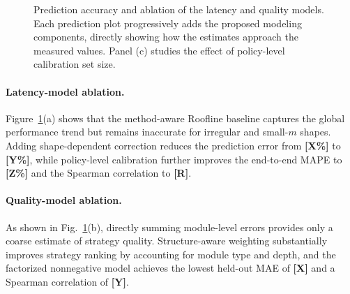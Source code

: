 \documentclass[letterpaper]{article} %
\begin{document}
\begin{figure}[t]
\centering
{}
\vspace{1mm}

\vspace{1mm}

\caption{Prediction accuracy and ablation of the latency and quality models. Each prediction plot progressively adds the proposed modeling components, directly showing how the estimates approach the measured values. Panel (c) studies the effect of policy-level calibration set size.}
\label{fig:modeling_ablation}
\end{figure}

\paragraph{Latency-model ablation.}
Figure~\ref{fig:modeling_ablation}(a) shows that the method-aware Roofline baseline captures the global performance trend but remains inaccurate for irregular and small-$m$ shapes. Adding shape-dependent correction reduces the prediction error from \textbf{[X\%]} to \textbf{[Y\%]}, while policy-level calibration further improves the end-to-end MAPE to \textbf{[Z\%]} and the Spearman correlation to \textbf{[R]}.

\paragraph{Quality-model ablation.}
As shown in Fig.~\ref{fig:modeling_ablation}(b), directly summing module-level errors provides only a coarse estimate of strategy quality. Structure-aware weighting substantially improves strategy ranking by accounting for module type and depth, and the factorized nonnegative model achieves the lowest held-out MAE of \textbf{[X]} and a Spearman correlation of \textbf{[Y]}.
\end{document}
